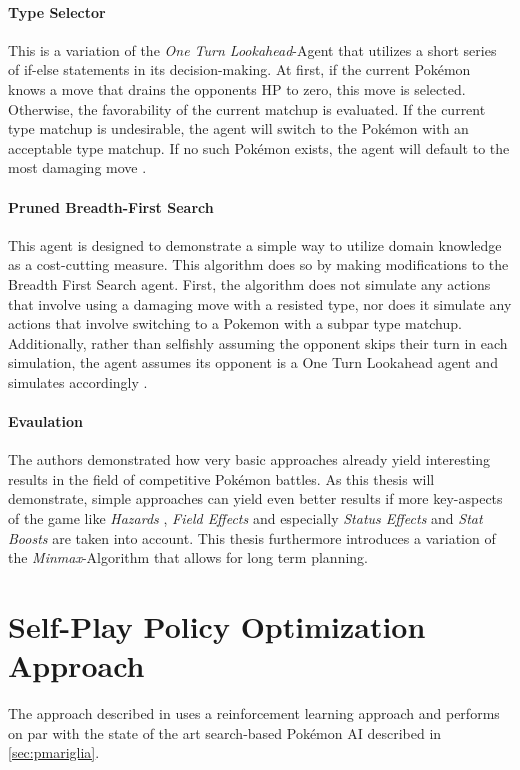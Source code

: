 \paragraph{Type Selector}
This is a variation of the \textit{One Turn Lookahead}-Agent that utilizes a short series of
if-else statements in its decision-making. At first, if the current Pokémon knows a move 
that drains the opponents \ac{HP} to zero, this move is selected. Otherwise, the 
favorability of the current matchup is evaluated. If the current type matchup is 
undesirable, the agent will switch to the Pokémon with an acceptable type matchup. If no
such Pokémon exists, the agent will default to the most damaging move 
\cite{Lee_Togelius_2017}.

\paragraph{Pruned Breadth-First Search}
This agent is designed to demonstrate a simple way to utilize domain knowledge as a cost-cutting 
measure. This algorithm does so by making modifications to the Breadth First Search agent. First, 
the algorithm does not simulate any actions that involve using a damaging move with a resisted type, 
nor does it simulate any actions that involve switching to a Pokemon with a subpar type matchup. 
Additionally, rather than selfishly assuming the opponent skips their turn in each simulation, the 
agent assumes its opponent is a One Turn Lookahead agent and simulates accordingly
\cite{Lee_Togelius_2017}.

\paragraph{Evaulation}
The authors demonstrated how very basic approaches already yield interesting results in the 
field of competitive Pokémon battles. As this thesis will demonstrate, simple approaches can 
yield even better results if more key-aspects of the game like \textit{Hazards} ,
\textit{Field Effects}  and especially \textit{Status Effects}
 and \textit{Stat Boosts} are taken into account. This thesis furthermore
introduces a variation of the \textit{Minmax}-Algorithm that allows for long term planning.

\section{Self-Play Policy Optimization Approach}
The approach described in \cite{Huang_Lee_2019} uses a reinforcement learning approach and performs 
on par with the state of the art search-based Pokémon AI described in \ref{sec:pmariglia}.